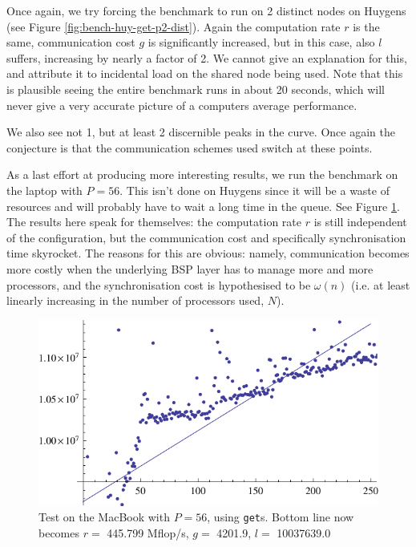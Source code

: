 \documentclass[a4paper]{article}
\begin{document}
Once again, we try forcing the benchmark to run on 2 distinct nodes on Huygens
(see Figure \ref{fig:bench-huy-get-p2-dist}). Again the computation rate $r$ is
the same, communication cost $g$ is significantly increased, but in this case,
also $l$ suffers, increasing by nearly a factor of 2. We cannot give an
explanation for this, and attribute it to incidental load on the shared node
being used. Note that this is plausible seeing the entire benchmark runs in
about 20 seconds, which will never give a very accurate picture of a computers
average performance. 

We also see not 1, but at least 2 discernible peaks in the curve. Once again the
conjecture is that the communication schemes used switch at these points. 

As a last effort at producing more interesting results, we run the benchmark on
the laptop with $P=56$. This isn't done on Huygens since it will be a waste of
resources and will probably have to wait a long time in the queue. See Figure
\ref{fig:bench-laptop-get-p56}. The results here speak for themselves: the
computation rate $r$ is still independent of the configuration, but the
communication cost and specifically synchronisation time skyrocket. The reasons
for this are obvious: namely, communication becomes more costly when the
underlying BSP layer has to manage more and more processors, and the
synchronisation cost is hypothesised to be $\omega(n)$ (i.e. at least linearly increasing in
the number of processors used, $N$). 

\begin{figure}[h]
    \begin{center}
        \includegraphics{img/bench-laptop-get-p56.pdf}
    \end{center}
    \caption{Test on the MacBook with $P=56$, using \texttt{get}s. Bottom line
    now becomes $r=$ 445.799 Mflop/s, $g=$ 4201.9, $l=$ 10037639.0}
    \label{fig:bench-laptop-get-p56}
\end{figure}
\end{document}
